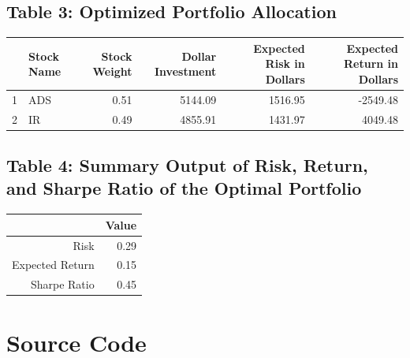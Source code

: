 \documentclass[12pt,english]{article}
\begin{document}
        \subsection{Table 3: Optimized Portfolio Allocation}
                \begin{table}[H]
                \centering
                \begin{tabular}{rlrrrr}
                  \hline
                 & Stock Name & Stock Weight & Dollar Investment & Expected Risk in Dollars & Expected Return in Dollars \\ 
                  \hline
                1 & ADS & 0.51 & 5144.09 & 1516.95 & -2549.48 \\ 
                  2 & IR & 0.49 & 4855.91 & 1431.97 & 4049.48 \\ 
                   \hline
                \end{tabular}
                \end{table}
                
        \subsection{Table 4: Summary Output of Risk, Return, and Sharpe Ratio of the Optimal Portfolio}
                \begin{table}[H]
                \centering
                \begin{tabular}{rr}
                \hline
                & Value \\ 
                \hline
                Risk & 0.29 \\ 
                Expected Return & 0.15 \\ 
                Sharpe Ratio & 0.45 \\ 
                \hline
                \end{tabular}
                \end{table}
    
    \newpage\section{Source Code}

    \lstset{basicstyle=\small,
            columns=fullflexible,
            frame=single,
            breaklines=true}

    \begin{singlespacing}    
        
    \end{singlespacing}
    
    
\end{document}
